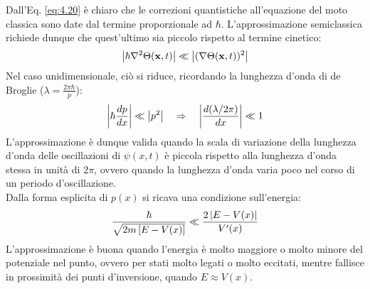 Dall'Eq. \ref{eq:4.20} è chiaro che le correzioni quantistiche all'equazione del moto classica sono date dal termine proporzionale ad $ \hbar $. L'approssimazione semiclassica richiede dunque che quest'ultimo sia piccolo rispetto al termine cinetico:
\begin{equation}
	\left\lvert\hbar \nabla^2 \Theta(\mathbf{x},t)\right\rvert \ll \left\lvert(\nabla \Theta(\mathbf{x},t))^2\right\rvert
	\label{eq:4.30}
\end{equation}
Nel caso unidimensionale, ciò si riduce, ricordando la lunghezza d'onda di de Broglie ($ \lambda = \frac{2\pi\hbar}{p} $):
\begin{equation*}
	\left\lvert\hbar \frac{dp}{dx}\right\rvert \ll \left\lvert p^2\right\rvert
	\quad \Rightarrow \quad
	\left\lvert\frac{d(\lambda / 2\pi)}{dx}\right\rvert \ll 1
\end{equation*}
L'approssimazione è dunque valida quando la scala di variazione della lunghezza d'onda delle oscillazioni di $ \psi(x,t) $ è piccola rispetto alla lunghezza d'onda stessa in unità di $ 2\pi $, ovvero quando la lunghezza d'onda varia poco nel corso di un periodo d'oscillazione.\\
Dalla forma esplicita di $ p(x) $ si ricava una condizione sull'energia:
\begin{equation*}
	\frac{\hbar}{\sqrt{2m \left[ E - V(x) \right]}} \ll \frac{2 \left\lvert E - V(x)\right\rvert}{V'(x)}
\end{equation*}
L'approssimazione è buona quando l'energia è molto maggiore o molto minore del potenziale nel punto, ovvero per stati molto legati o molto eccitati, mentre fallisce in prossimità dei punti d'inversione, quando $ E \approx V(x) $.

